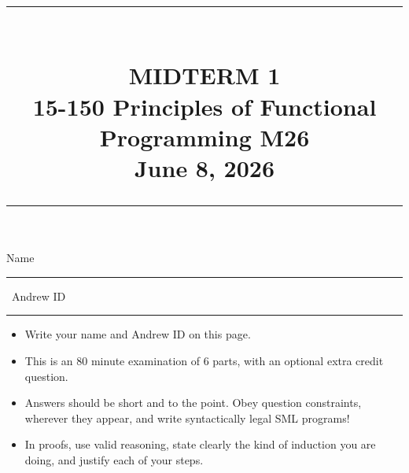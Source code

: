 \documentclass[addpoints,12pt]{exam}
\newcommand{\HRule}[1]{\rule{\linewidth}{#1}}
\begin{document}
\pagestyle{headandfoot}
\footer{}{\thepage}{}


\setlength{\droptitle}{-8em}   %

\title{ \normalsize \textsc{}
		\HRule{1.5pt} \\
		\large \textbf{
      \uppercase{Midterm 1} \\
      15-150 Principles of Functional Programming M26 \\
      \small{June 8, 2026}} \\
      \vspace{-6pt}
    \HRule{1.5pt}
}
\date{}

\maketitle

\vspace{-2.5cm}

\hspace{-1cm} Name \rule{6cm}{0.4pt} \, Andrew ID \rule{6cm}{0.4pt}

\vspace{5pt}

\begin{itemize}
  \item Write your name and Andrew ID on this page.
  \item This is an 80 minute examination of 6 parts, with an optional extra credit question.
  \item Answers should be short and to the point. Obey question constraints, wherever
  they appear, and write syntactically legal SML programs!
  \item In proofs, use valid reasoning, state clearly the kind of induction you are
  doing, and justify each of your steps.
\end{itemize}
\vspace{\fill}

{\small
\vqword{}
\begin{center}
\gradetable[v][questions]
\end{center}
}
\end{document}
